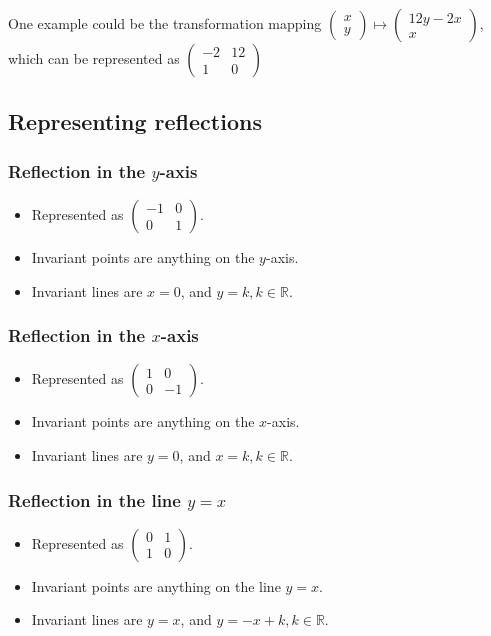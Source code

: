One example could be the transformation mapping $\begin{pmatrix}x \\y \end{pmatrix} \mapsto \begin{pmatrix}12y-2x \\ x \end{pmatrix}$, which can be represented as $\begin{pmatrix}-2 & 12 \\ 1 & 0\end{pmatrix}$

\subsection{Representing reflections}
\subsubsection{Reflection in the $y$-axis}
\begin{itemize}
	\item Represented as $\begin{pmatrix}-1 & 0 \\ 0 & 1\end{pmatrix}$.
	\item Invariant points are anything on the $y$-axis.
	\item Invariant lines are $x=0$, and $y=k,k \in \mathbb{R}$.
\end{itemize}

\subsubsection{Reflection in the $x$-axis}
\begin{itemize}
	\item Represented as $\begin{pmatrix}1 & 0 \\ 0 & -1\end{pmatrix}$.
	\item Invariant points are anything on the $x$-axis.
	\item Invariant lines are $y=0$, and $x=k,k \in \mathbb{R}$.
\end{itemize}


\subsubsection{Reflection in the line $y=x$}
\begin{itemize}
	\item Represented as $\begin{pmatrix}0 & 1 \\ 1 & 0\end{pmatrix}$.
	\item Invariant points are anything on the line $y=x$.
	\item Invariant lines are $y=x$, and $y=-x+k,k \in \mathbb{R}$.
\end{itemize}

